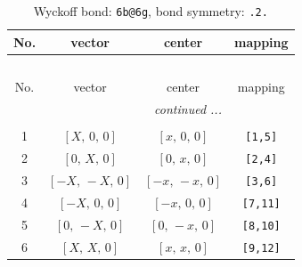 \documentclass[fleqn,8pt]{jsarticle}
\begin{document}
\begin{longtable}{cccc}
\caption{Wyckoff bond: {\tt 6b@6g}, bond symmetry: {\tt .2.}}
 \\
 \hline \hline
No. & vector & center & mapping \\ \hline \endfirsthead

\multicolumn{3}{l}{\tablename\ \thetable{}} \\
 \hline \hline
No. & vector & center & mapping \\ \hline \endhead

 \hline \hline
\multicolumn{3}{r}{\footnotesize\it continued ...} \\ \endfoot

 \hline \hline
\multicolumn{3}{r}{} \\ \endlastfoot

1 & $\left[ X,\, 0,\, 0 \right]$ & $\left[ x,\, 0,\, 0 \right]$ & {\tt [1,5]} \\ \hline
2 & $\left[ 0,\, X,\, 0 \right]$ & $\left[ 0,\, x,\, 0 \right]$ & {\tt [2,4]} \\ \hline
3 & $\left[ - X,\, - X,\, 0 \right]$ & $\left[ - x,\, - x,\, 0 \right]$ & {\tt [3,6]} \\ \hline
4 & $\left[ - X,\, 0,\, 0 \right]$ & $\left[ - x,\, 0,\, 0 \right]$ & {\tt [7,11]} \\ \hline
5 & $\left[ 0,\, - X,\, 0 \right]$ & $\left[ 0,\, - x,\, 0 \right]$ & {\tt [8,10]} \\ \hline
6 & $\left[ X,\, X,\, 0 \right]$ & $\left[ x,\, x,\, 0 \right]$ & {\tt [9,12]} \\
\end{longtable}
\renewcommand{\arraystretch}{1.2}
\end{document}
